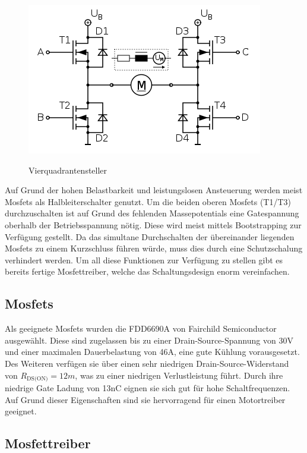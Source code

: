 \begin{figure}[H]
\centering
\includegraphics[width=.8\textwidth]{Vierquadrantensteller.png}\\
\caption{Vierquadrantensteller}%
\label{fig:Vierquadrantensteller}
\end{figure}


Auf Grund der hohen Belastbarkeit und leistungslosen Ansteuerung werden meist Mosfets als Halbleiterschalter genutzt. Um die beiden oberen Mosfets (T1/T3) durchzuschalten
ist auf Grund des fehlenden Massepotentials eine Gatespannung oberhalb der Betriebsspannung nötig. Diese wird meist mittels Bootstrapping zur
Verfügung gestellt. Da das simultane Durchschalten der übereinander liegenden Mosfets zu einem Kurzschluss führen würde, muss dies durch
eine Schutzschalung verhindert werden. Um all diese Funktionen zur Verfügung zu stellen gibt es bereits fertige Mosfettreiber,
welche das Schaltungsdesign enorm vereinfachen.


\subsection{Mosfets}
Als geeignete Mosfets wurden die FDD6690A von Fairchild Semiconductor ausgewählt. Diese sind zugelassen bis zu einer Drain-Source-Spannung von 30V und einer maximalen Dauerbelastung
von 46A, eine gute Kühlung vorausgesetzt. Des Weiteren verfügen sie über einen sehr niedrigen Drain-Source-Widerstand von $R_{\text{DS(ON)}}= 12 m$, was zu einer niedrigen Verlustleistung führt. Durch ihre niedrige 
Gate Ladung von 13nC eignen sie sich gut für hohe Schaltfrequenzen. Auf Grund dieser Eigenschaften sind sie hervorragend für einen Motortreiber geeignet.


\subsection{Mosfettreiber}
